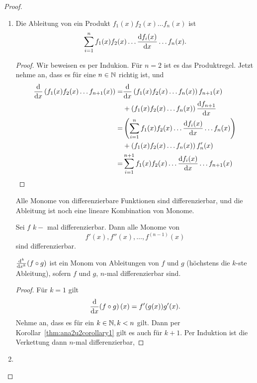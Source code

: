 \begin{proof}
	\begin{enumerate}[label=\roman*)]
		\item 
			\begin{Theorem}
				Die Ableitung von ein Produkt $f_1(x)f_2(x)\dots f_n(x)$ ist \[
				\sum_{i=1}^n f_1(x)f_2(x)\dots \dv{f_i(x)}{x}\dots f_n(x).\]
			\end{Theorem}
			\begin{proof}
				Wir beweisen es per Indukion. F\"{u}r $n=2$ ist es das Produktregel. Jetzt nehme an, dass es f\"{u}r eine $n\in \mathbb{N}$ richtig ist, und 
				\begin{align*}
					\dv{x}\left( f_1(x)f_2(x)\dots f_{n+1}(x) \right) =& \dv{x}\left( f_1(x)f_2(x)\dots f_n(x) \right) f_{n+1}(x)\\
											   &+\left( f_1(x)f_2(x)\dots f_n(x) \right) \dv{f_{n+1}}{x}\\
					=& \left( \sum_{i=1}^n f_1(x)f_2(x)\dots \dv{f_i(x)}{x}\dots f_n(x) \right)\\
					 &+\left( f_1(x)f_2(x)\dots f_n(x) \right) f_n'(x)\\
					=&\sum_{i=1}^{n+1} f_1(x)f_2(x)\dots \dv{f_i(x)}{x}\dots f_{n+1}(x)
				\end{align*}
			\end{proof}
			\begin{Corollary}\label{thm:ana2u2corollary1}
				Alle Monome von differenzierbare Funktionen sind differenzierbar, und die Ableitung ist noch eine lineare Kombination von Monome.
			\end{Corollary}
			\begin{Corollary}
				Sei $f$ $k-$ mal differenzierbar. Dann alle Monome von \[f'(x),f''(x),\dots, f^{(n-1)}(x)\] sind differenzierbar.
			\end{Corollary}
			\begin{Theorem}
				$\dv[k]{x}(f\circ g)$ ist ein Monom von Ableitungen von $f$ und $g$ (höchstens die $k$-ste Ableitung), sofern $f$ und $g$, $n$-mal differenzierbar sind.
			\end{Theorem}
			\begin{proof}
				F\"{u}r $k=1$ gilt
				\[
					\dv{x}(f\circ g)\left(x \right) =f'(g(x))g'(x)
				.\] 
				Nehme an, dass es f\"{u}r ein $k\in \mathbb{N},k<n$ gilt. Dann per Korollar~\ref{thm:ana2u2corollary1} gilt es auch f\"{u}r $k+1$. Per Induktion ist die Verkettung dann $n$-mal differenzierbar,
			\end{proof}
		\item 
			\begin{Lemma}

\end{Lemma}
\end{enumerate}
\end{proof}
